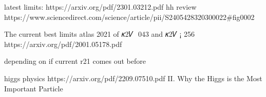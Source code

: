 latest limits: https://arxiv.org/pdf/2301.03212.pdf 
hh review 
https://www.sciencedirect.com/science/article/pii/S2405428320300022#fig0002


The current best limits 
atlas 2021 
of 𝜅2𝑉  043 and 𝜅2𝑉 ¡ 256
https://arxiv.org/pdf/2001.05178.pdf 

depending on if current r21 comes out before
    

higgs physics
https://arxiv.org/pdf/2209.07510.pdf 
II. Why the Higgs is the Most Important Particle